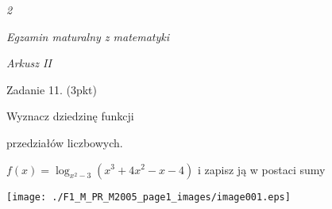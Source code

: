 \documentclass[a4paper,12pt]{article}
\begin{document}
{\it 2}

{\it Egzamin maturalny z matematyki}

{\it Arkusz II}

Zadanie 11. (3pkt)

Wyznacz dziedzinę funkcji

przedziałów liczbowych.

$f(x)=\log_{x^{2}-3}(x^{3}+4x^{2}-x-4)$ i zapisz ją w postaci sumy
\begin{center}
\texttt{[image: ./F1\_M\_PR\_M2005\_page1\_images/image001.eps]}
\end{center}
\end{document}
